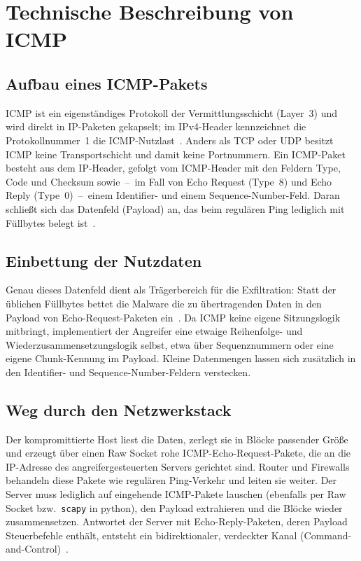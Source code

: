 \documentclass[11pt,a4paper]{article}
\begin{document}
\section{Technische Beschreibung von ICMP}

\subsection{Aufbau eines ICMP-Pakets}
ICMP ist ein eigenständiges Protokoll der Vermittlungsschicht (Layer~3) und wird
direkt in IP-Paketen gekapselt; im IPv4-Header kennzeichnet die Protokollnummer~1
die ICMP-Nutzlast~\cite{rfc792}. Anders als TCP oder UDP besitzt ICMP keine
Transportschicht und damit keine Portnummern. Ein ICMP-Paket besteht aus dem
IP-Header, gefolgt vom ICMP-Header mit den Feldern Type, Code und Checksum
sowie~--~im Fall von Echo Request (Type~8) und Echo Reply (Type~0)~--~einem
Identifier- und einem Sequence-Number-Feld. Daran schließt sich das Datenfeld
(Payload) an, das beim regulären Ping lediglich mit Füllbytes belegt
ist~\cite{rfc792}.
 
\subsection{Einbettung der Nutzdaten}
Genau dieses Datenfeld dient als Trägerbereich für die Exfiltration: Statt der
üblichen Füllbytes bettet die Malware die zu übertragenden Daten in den Payload
von Echo-Request-Paketen ein~\cite{mitreT1572, elastic}. Da ICMP keine eigene
Sitzungslogik mitbringt, implementiert der Angreifer eine etwaige Reihenfolge-
und Wiederzusammensetzungslogik selbst, etwa über Sequenznummern oder eine
eigene Chunk-Kennung im Payload. Kleine Datenmengen lassen sich zusätzlich in
den Identifier- und Sequence-Number-Feldern verstecken.
 
\subsection{Weg durch den Netzwerkstack}
Der kompromittierte Host liest die Daten, zerlegt sie in Blöcke passender Größe
und erzeugt über einen Raw Socket rohe ICMP-Echo-Request-Pakete, die an die
IP-Adresse des angreifergesteuerten Servers gerichtet sind. Router und Firewalls
behandeln diese Pakete wie regulären Ping-Verkehr und leiten sie weiter. Der
Server muss lediglich auf eingehende ICMP-Pakete lauschen (ebenfalls per Raw
Socket bzw.\ \texttt{scapy} in python), den Payload extrahieren und die Blöcke wieder
zusammensetzen. Antwortet der Server mit Echo-Reply-Paketen, deren Payload
Steuerbefehle enthält, entsteht ein bidirektionaler, verdeckter Kanal
(Command-and-Control)~\cite{mitreT1095}.
 
\end{document}
